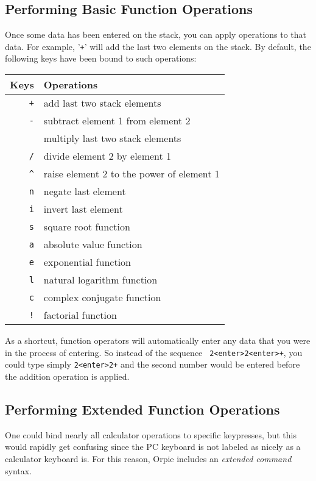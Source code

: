 \documentclass[11pt,notitlepage]{article}
\begin{document}
\subsection{Performing Basic Function Operations}
\label{functionops}
Once some data has been entered on the stack, you can apply operations to that
data.  For example, '{\tt +}' will add the last two elements on the stack.  By
default, the following keys have been bound to such operations:
\begin{center}
   \begin{tabular}[t]{|r|l|}
      \hline Keys & Operations \\
      \hline
      {\tt +} & add last two stack elements \\
      {\tt -} & subtract element 1 from element 2 \\
      {\tt *} & multiply last two stack elements \\
      {\tt /} & divide element 2 by element 1 \\
      {\tt \^{}} & raise element 2 to the power of element 1 \\
      {\tt n} & negate last element \\
      {\tt i} & invert last element \\
      {\tt s} & square root function \\
      {\tt a} & absolute value function \\
      {\tt e} & exponential function \\
      {\tt l} & natural logarithm function \\
      {\tt c} & complex conjugate function \\
      {\tt !} & factorial function  \\
      \hline
   \end{tabular}
\end{center}

As a shortcut, function operators will automatically enter any data that you
were in the process of entering.  So instead of the sequence {\tt
2<enter>2<enter>+}, you could type simply {\tt 2<enter>2+} and the second number
would be entered before the addition operation is applied.

\subsection{Performing Extended Function Operations}
\label{extendedfunctions}
One could bind nearly all calculator operations to specific keypresses, but this
would rapidly get confusing since the PC keyboard is not labeled as nicely as a
calculator keyboard is.  For this reason, Orpie includes an {\em extended
command} syntax.
\end{document}
